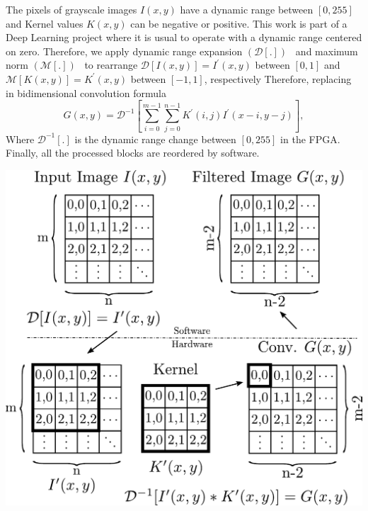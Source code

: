 \documentclass[a1paper,portrait,fontscale=0.43]{baposter}
\begin{document}
\begin{poster}
{The pixels of grayscale images $I(x,y)$ have a dynamic range between
$[0,255]$ and Kernel values $K(x,y)$ can be negative or positive. This work is
part of a Deep Learning project where it is usual to operate with a dynamic
range centered on zero. Therefore, we apply dynamic range expansion
$(\mathcal{D}[.])$~\cite{dinamic_rango} and maximum norm
$(\mathcal{M}[.])$~\cite{max_norm} to rearrange
$\mathcal{D}[I(x,y)]=I^\prime(x,y)$ between $[0,1]$ and
$\mathcal{M}[K(x,y)]=K^\prime(x,y)$ between $[-1,1]$, respectively
Therefore, replacing in bidimensional convolution formula 
 $$G(x,y) = \mathcal{D}^{-1}\left[\sum_{i=0}^{m-1} \sum_{j=0}^{n-1}K^\prime(i,j)I^\prime(x-i,y-j)\right],$$ 
Where $\mathcal{D}^{-1}[.]$ is the dynamic range change between $[0,255]$ in the
FPGA. Finally, all the processed blocks are reordered by software.
\begin{center}
  \includegraphics[width=\linewidth]{wflow3}
\end{center}
}

\end{poster}
\end{document}
